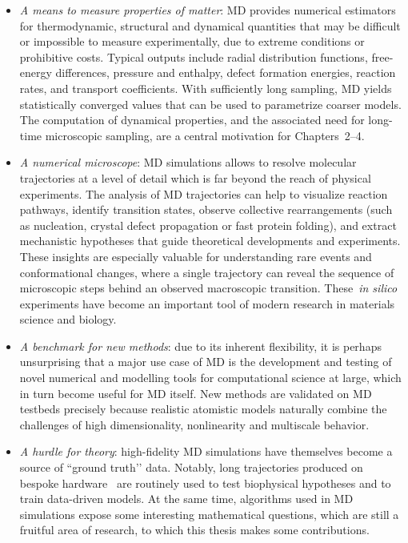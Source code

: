 \begin{itemize}
\item \textit{A means to measure properties of matter}: MD provides numerical estimators for thermodynamic, structural and dynamical quantities that may be difficult or impossible to measure experimentally, due to extreme conditions or prohibitive costs. Typical outputs include radial distribution functions, free-energy differences, pressure and enthalpy, defect formation energies, reaction rates, and transport coefficients. With sufficiently long sampling, MD yields statistically converged values that can be used to parametrize coarser models. The computation of dynamical properties, and the associated need for long-time microscopic sampling, are a central motivation for Chapters~2--4.
  \item \textit{A numerical microscope}: MD simulations allows to resolve molecular trajectories at a level of detail which is far beyond the reach of physical experiments. The analysis of MD trajectories can help to visualize reaction pathways, identify transition states, observe collective rearrangements (such as nucleation, crystal defect propagation or fast protein folding), and extract mechanistic hypotheses that guide theoretical developments and experiments. These insights are especially valuable for understanding rare events and conformational changes, where a single trajectory can reveal the sequence of microscopic steps behind an observed macroscopic transition. These~\textit{in silico} experiments have become an important tool of modern research in materials science and biology.
  \item \textit{A benchmark for new methods}: due to its inherent flexibility, it is perhaps unsurprising that a major use case of MD is the development and testing of novel numerical and modelling tools for computational science at large, which in turn become useful for MD itself. New methods are validated on MD testbeds precisely because realistic atomistic models naturally combine the challenges of high dimensionality, nonlinearity and multiscale behavior.
  \item \textit{A hurdle for theory}: high-fidelity MD simulations have themselves become a source of “ground truth’’ data. Notably, long trajectories produced on bespoke hardware~\cite{SDDKLSYBBCal08} are routinely used to test biophysical hypotheses and to train data-driven models. At the same time, algorithms used in MD simulations expose some interesting mathematical questions, which are still a fruitful area of research, to which this thesis makes some contributions.
\end{itemize}

